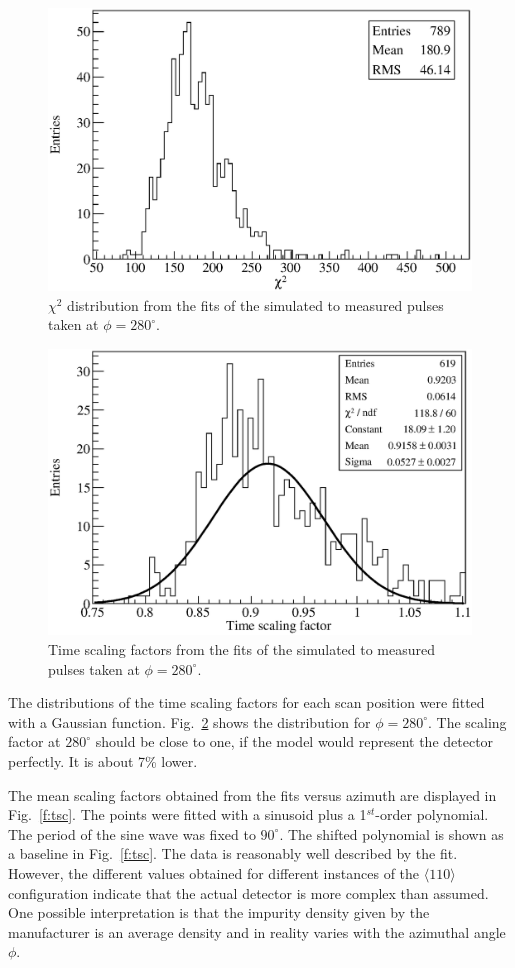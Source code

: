 \documentclass[epj,referee]{svjour}
\begin{document}
\begin{figure}[htbp]
\centering
\includegraphics[width=0.9\linewidth]{chi280}
\caption{$\chi^{2}$ distribution from the fits of the simulated to
measured pulses taken at $\phi=280^{\circ}$.}
\label{f:x2}
\end{figure}

\begin{figure}[htbp]
\centering
\includegraphics[width=0.9\linewidth]{tscale280}
\caption{Time scaling factors from the fits of the simulated to
measured pulses taken at $\phi=280^{\circ}$.}
\label{f:ts280}
\end{figure}

The distributions of the time scaling factors for each scan position
were fitted with a Gaussian function. Fig.~\ref{f:ts280} shows the
distribution for $\phi = 280^{\circ}$. The scaling factor at
$280^{\circ}$ should be close to one, if the model would represent the
detector perfectly. It is about 7\% lower.

The mean scaling factors obtained from the fits versus azimuth are
displayed in Fig.~\ref{f:tsc}. The points were fitted with a sinusoid
plus a 1$^{st}$-order polynomial. The period of the sine wave was
fixed to $90^{\circ}$. The shifted polynomial is shown as a baseline
in Fig.~\ref{f:tsc}. The data is reasonably well described by the
fit. However, the different values obtained for different instances of
the $\langle 110 \rangle$ configuration indicate that the actual
detector is more complex than assumed. One possible interpretation is
that the impurity density given by the manufacturer is an average
density and in reality varies with the azimuthal angle $\phi$.
\end{document}
